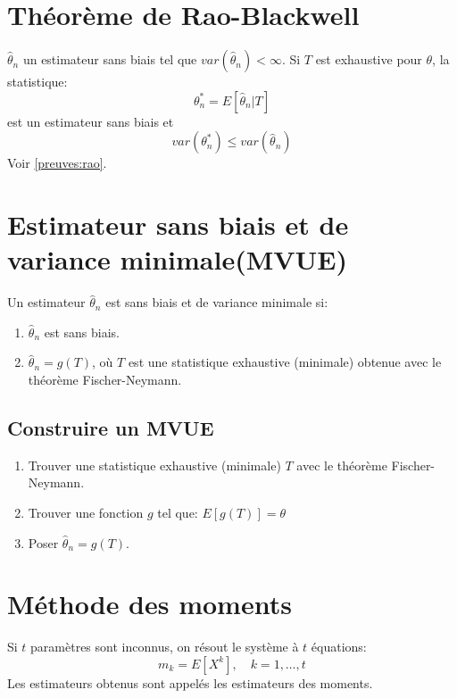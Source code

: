 \section{Théorème de Rao-Blackwell}\label{theoreme-de-rao-blackwell}

\label{stats:rao} \(\hat{\theta}_n\) un estimateur sans biais tel que
\(var(\hat{\theta}_n)<\infty\). Si \(T\) est exhaustive pour \(\theta\),
la statistique: \[
\theta^{*}_n=E[\hat{\theta}_n|T]
\] est un estimateur sans biais et \[
var(\theta^{*}_n)\le var(\hat{\theta}_n)
\] Voir \autoref{preuves:rao}.

\section{Estimateur sans biais et de variance minimale(MVUE)}\label{estimateur-sans-biais-et-de-variance-minimalemvue}

Un estimateur \(\hat{\theta}_n\) est sans biais et de variance minimale
si:

\begin{enumerate}
\def\labelenumi{\arabic{enumi}.}
\item
  \(\hat{\theta}_n\) est sans biais.
\item
  \(\hat{\theta}_n=g(T)\), où \(T\) est une statistique exhaustive
  (minimale) obtenue avec le théorème Fischer-Neymann.
\end{enumerate}

\subsection{Construire un MVUE}\label{construire-un-mvue}

\begin{enumerate}
\def\labelenumi{\arabic{enumi}.}
\item
  Trouver une statistique exhaustive (minimale) \(T\) avec le théorème
  Fischer-Neymann.
\item
  Trouver une fonction \(g\) tel que: \(E[g(T)]=\theta\)
\item
  Poser \(\hat{\theta}_n=g(T)\).
\end{enumerate}

\section{Méthode des moments}\label{methode-des-moments}

Si \(t\) paramètres sont inconnus, on résout le système à \(t\)
équations: \[
m_k=E\left[X^k\right],\quad k=1,\dots,t
\] Les estimateurs obtenus sont appelés les estimateurs des moments.

